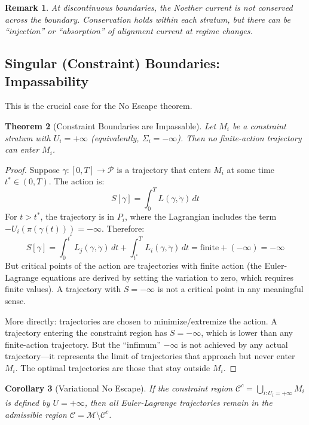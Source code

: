 \documentclass[11pt,a4paper]{article}
\newtheorem{theorem}{Theorem}[section]
\newtheorem{corollary}[theorem]{Corollary}
\newtheorem{remark}[theorem]{Remark}
\begin{document}
\begin{remark}
At discontinuous boundaries, the Noether current is \textit{not} conserved across the boundary. Conservation holds \textit{within} each stratum, but there can be ``injection'' or ``absorption'' of alignment current at regime changes.
\end{remark}

\subsection{Singular (Constraint) Boundaries: Impassability}

This is the crucial case for the No Escape theorem.

\begin{theorem}[Constraint Boundaries are Impassable]\label{thm:impassable}
Let $M_i$ be a constraint stratum with $U_i = +\infty$ (equivalently, $\Sigma_i = -\infty$). Then no finite-action trajectory can enter $M_i$.
\end{theorem}

\begin{proof}
Suppose $\gamma : [0, T] \to \mathcal{P}$ is a trajectory that enters $M_i$ at some time $t^* \in (0, T)$. The action is:
\[
    S[\gamma] = \int_0^T L(\gamma, \dot{\gamma})\,dt
\]
For $t > t^*$, the trajectory is in $P_i$, where the Lagrangian includes the term $-U_i(\pi(\gamma(t))) = -\infty$.
Therefore:
\[
    S[\gamma] = \int_0^{t^*} L_j(\gamma, \dot{\gamma})\,dt + \int_{t^*}^T L_i(\gamma, \dot{\gamma})\,dt = \text{finite} + (-\infty) = -\infty
\]
But critical points of the action are trajectories with finite action (the Euler-Lagrange equations are derived by setting the variation to zero, which requires finite values). A trajectory with $S = -\infty$ is not a critical point in any meaningful sense.

More directly: trajectories are chosen to minimize/extremize the action. A trajectory entering the constraint region has $S = -\infty$, which is lower than any finite-action trajectory. But the ``infimum'' $-\infty$ is not achieved by any actual trajectory---it represents the limit of trajectories that approach but never enter $M_i$. The optimal trajectories are those that stay outside $M_i$.
\end{proof}

\begin{corollary}[Variational No Escape]
If the constraint region $\mathcal{C}^c = \bigcup_{i: U_i = +\infty} M_i$ is defined by $U = +\infty$, then all Euler-Lagrange trajectories remain in the admissible region $\mathcal{C} = \mathcal{M} \setminus \mathcal{C}^c$.
\end{corollary}
\end{document}
